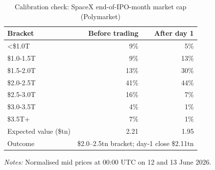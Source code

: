 \begin{table}[!htbp]\centering\footnotesize
\caption{Calibration check: SpaceX end-of-IPO-month market cap (Polymarket)}\label{tab:s12}

\begin{threeparttable}
\begin{tabular}{lrr}
\toprule
Bracket & Before trading & After day 1 \\
\midrule
<\$1.0T & 9\% & 5\% \\
\$1.0-1.5T & 9\% & 13\% \\
\$1.5-2.0T & 13\% & 30\% \\
\$2.0-2.5T & 41\% & 44\% \\
\$2.5-3.0T & 16\% & 7\% \\
\$3.0-3.5T & 4\% & 1\% \\
\$3.5T+ & 7\% & 1\% \\
\midrule
Expected value (\$tn) & 2.21 & 1.95 \\
Outcome & \multicolumn{2}{l}{\$2.0--2.5tn bracket; day-1 close \$2.11tn} \\
\bottomrule
\end{tabular}
\begin{tablenotes}[flushleft]\footnotesize
\item \textit{Notes:} Normalised mid prices at 00:00 UTC on 12 and 13 June 2026.
\end{tablenotes}
\end{threeparttable}

\end{table}
